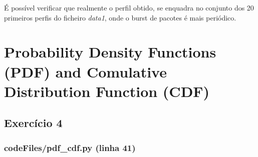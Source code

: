 \documentclass[pdftex,12pt,a4paper]{report}
\begin{document}
É possível verificar que realmente o perfil obtido, se enquadra no conjunto dos 20 primeiros perfis do ficheiro \textit{data1}, onde o burst de pacotes é mais periódico.

\section{Probability Density Functions (PDF) and Comulative Distribution Function (CDF)}
\subsection{Exercício 4}
\subsubsection{codeFiles/pdf\_cdf.py (linha 41)}
\end{document}

